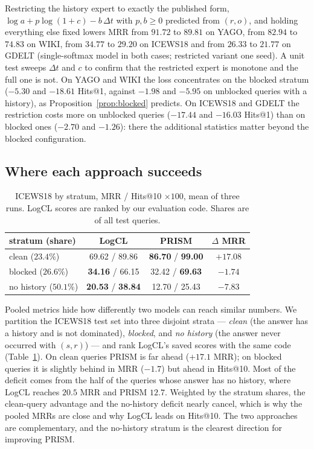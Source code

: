 \documentclass[conference]{IEEEtran}
\begin{document}
Restricting the history expert to exactly the published form,
$\log a + p\log(1+c) - b\,\Delta t$ with $p,b\ge 0$ predicted from $(r,o)$, and
holding everything else fixed lowers MRR from $91.72$ to $89.81$ on YAGO, from
$82.94$ to $74.83$ on WIKI, from $34.77$ to $29.20$ on ICEWS18 and from $26.33$
to $21.77$ on GDELT (single-softmax model in both cases; restricted variant one
seed). A unit test sweeps $\Delta t$ and $c$ to confirm that the restricted
expert is monotone and the full one is not. On YAGO and WIKI the loss
concentrates on the blocked stratum ($-5.30$ and $-18.61$ Hits@1, against
$-1.98$ and $-5.95$ on unblocked queries with a history), as
Proposition~\ref{prop:blocked} predicts. On ICEWS18 and GDELT the restriction
costs more on unblocked queries ($-17.44$ and $-16.03$ Hits@1) than on blocked
ones ($-2.70$ and $-1.26$): there the additional statistics matter beyond the
blocked configuration.

\subsection{Where each approach succeeds}
\label{sec:strat}

\begin{table}[t]
\centering
\caption{ICEWS18 by stratum, MRR / Hits@10 $\times100$, mean of three runs.
LogCL scores are ranked by our evaluation code. Shares are of all test
queries.}
\label{tab:strat}
\setlength{\tabcolsep}{4pt}
\begin{tabular}{lccc}
\toprule
stratum (share) & LogCL & PRISM & $\Delta$ MRR \\
\midrule
clean ($23.4\%$)              & 69.62 / 89.86 & \textbf{86.70} / \textbf{99.00} & $+17.08$ \\
blocked ($26.6\%$)            & \textbf{34.16} / 66.15 & 32.42 / \textbf{69.63} & $-1.74$ \\
no history ($50.1\%$)         & \textbf{20.53} / \textbf{38.84} & 12.70 / 25.43 & $-7.83$ \\
\bottomrule
\end{tabular}
\end{table}

Pooled metrics hide how differently two models can reach similar numbers. We
partition the ICEWS18 test set into three disjoint strata --- \emph{clean}
(the answer has a history and is not dominated), \emph{blocked}, and
\emph{no history} (the answer never occurred with $(s,r)$) --- and rank LogCL's
saved scores with the same code (Table~\ref{tab:strat}). On clean queries
PRISM is far ahead ($+17.1$ MRR); on blocked queries it is slightly behind in
MRR ($-1.7$) but ahead in Hits@10. Most of the deficit comes from the half of
the queries whose answer has no history, where LogCL reaches $20.5$ MRR and
PRISM $12.7$. Weighted by the stratum shares, the clean-query advantage and the
no-history deficit nearly cancel, which is why the pooled MRRs are close and why
LogCL leads on Hits@10. The two approaches are complementary, and the
no-history stratum is the clearest direction for improving PRISM.
\end{document}
